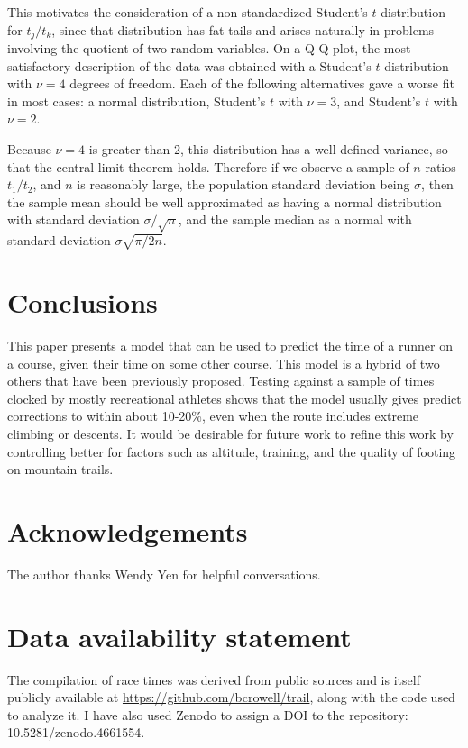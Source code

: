 \documentclass[10pt,letterpaper]{article}
\begin{document}
This motivates the consideration of a non-standardized Student's $t$-distribution for $t_j/t_k$, since that
distribution has fat tails and arises naturally in problems involving the quotient of two random variables.
On a Q-Q plot, the most satisfactory description of the data was obtained with a Student's
$t$-distribution with $\nu=4$ degrees of freedom.
Each of the following alternatives gave a worse fit in most cases: a normal distribution,
Student's $t$ with $\nu=3$, and Student's $t$ with $\nu=2$.

Because $\nu=4$ is greater than 2, this distribution has a well-defined variance, so that
the central limit theorem holds. Therefore if we observe a sample of $n$ ratios $t_1/t_2$,
and $n$ is reasonably large,
the population standard deviation being $\sigma$, then the sample mean should be well
approximated as having a normal distribution with standard deviation $\sigma/\sqrt{n}$,
and the sample median as a normal with standard deviation $\sigma\sqrt{\pi/2n}$.

\section{Conclusions}
This paper presents a model that can be used to predict the time of a runner on a
course, given their time on some other course. This model is a hybrid of two others that have been previously
proposed. Testing against a sample of times
clocked by mostly recreational athletes shows that
the model usually gives predict corrections
to within about 10-20\%, even when the route includes extreme climbing or descents.
It would be desirable for future work to refine this work by controlling better for factors such
as altitude, training, and the quality of footing on mountain trails.

\section*{Acknowledgements}

The author thanks Wendy Yen for helpful conversations.

\section*{Data availability statement}

The compilation
of race times was derived from public sources and is itself publicly available at \url{https://github.com/bcrowell/trail}, along with the
code used to analyze it. I have also used Zenodo to
assign a DOI to the repository: 10.5281/zenodo.4661554.


\end{document}

